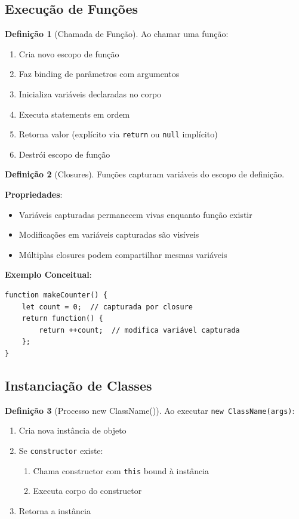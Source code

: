 \documentclass[12pt,a4paper]{article}
\theoremstyle{definition}
\newtheorem{definition}{Definição}[section]
\begin{document}
\subsection{Execução de Funções}

\begin{definition}[Chamada de Função]
Ao chamar uma função:

\begin{enumerate}
    \item Cria novo escopo de função
    \item Faz binding de parâmetros com argumentos
    \item Inicializa variáveis declaradas no corpo
    \item Executa statements em ordem
    \item Retorna valor (explícito via \texttt{return} ou \texttt{null} implícito)
    \item Destrói escopo de função
\end{enumerate}
\end{definition}

\begin{definition}[Closures]
Funções capturam variáveis do escopo de definição.

\textbf{Propriedades}:
\begin{itemize}
    \item Variáveis capturadas permanecem vivas enquanto função existir
    \item Modificações em variáveis capturadas são visíveis
    \item Múltiplas closures podem compartilhar mesmas variáveis
\end{itemize}

\textbf{Exemplo Conceitual}:
\begin{verbatim}
function makeCounter() {
    let count = 0;  // capturada por closure
    return function() {
        return ++count;  // modifica variável capturada
    };
}
\end{verbatim}
\end{definition}

\subsection{Instanciação de Classes}

\begin{definition}[Processo new ClassName()]
Ao executar \texttt{new ClassName(args)}:

\begin{enumerate}
    \item Cria nova instância de objeto
    \item Se \texttt{constructor} existe:
    \begin{enumerate}
        \item Chama constructor com \texttt{this} bound à instância
        \item Executa corpo do constructor
    \end{enumerate}
    \item Retorna a instância
\end{enumerate}
\end{definition}
\end{document}
